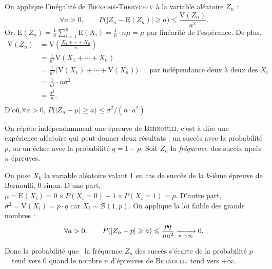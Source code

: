 \begin{prv}
	On applique l'inégalité de \textsc{Bienaimé-Thebychev} à la variable aléatoire $Z_n$ : \[
		\forall a > 0,\quad\quad P\big(\big|Z_n - \mathrm{E}(Z_n)\big| \ge a\big) \le \frac{\mathrm{V}(Z_n)}{a^2}
	.\]
	Or, $\mathrm{E}(Z_n) = \frac{1}{n} \sum_{i=1}^n \mathrm{E}(X_i) = \frac{1}{n} \cdot n \mu = \mu$ par linéarité de l'espérance. De plus,
	\begin{align*}
		\mathrm{V}(Z_n) &= \mathrm{V}\left(\frac{X_1 + \cdots + X_n}{n} \right)  \\
		&= \frac{1}{n^2} \mathrm{V}(X_1 + \cdots + X_n) \\
		&= \frac{1}{n^2} \big( \mathrm{V}(X_1) + \cdots + \mathrm{V}(X_n) \big) && \text{par indépendance deux à deux des $X_i$} \\
		&= \frac{1}{n^2} \cdot n \sigma^2 \\
		&= \frac{\sigma^2}{n}. \\
	\end{align*}
	D'où,$\forall a > 0$, $P\big(\big|Z_n - \mu\big| \ge a\big) \le \sigma^2/(n\cdot a^2)$.
\end{prv}

\begin{exm}
	On répète {\color{red}indépendamment} une épreuve de \textsc{Bernoulli}, c'est à dire une expérience aléatoire qui peut donner deux résultats : un succès avec la probabilité $p$, ou un échec avec la probabilité $q = 1 - p$. Soit $Z_n$ la \textit{fréquence}\footnotemark\ des succès après $n$ épreuves.

	On pose $X_k$ la variable aléatoire valant 1 en cas de succès de la $k$-ième épreuve de Bernoulli, 0 sinon.
	D'une part, $\mu = \mathrm{E}(X_i) = 0 \times P(X_i = 0) + 1 \times P(X_i = 1) = p$.
	D'autre part, $\sigma^2 = \mathrm{V}(X_i) = p\cdot q$ car $X_i \sim \mathcal{B}(1, p)$.
	On applique la loi faible des grands nombres : \[
		\forall a > 0, \quad\quad P(|Z_n - p| \geqslant a) \leqslant \frac{pq}{na^2} \xrightarrow[n\to \infty]{} 0
	.\]

	Donc la probabilité que \guillemotleft~la fréquence $Z_n$ des succès s'écarte de la probabilité $p$~\guillemotright\ tend vers 0 quand le nombre $n$ d'épreuves de \textsc{Bernoulli} tend vers $+\infty$.
\end{exm}


